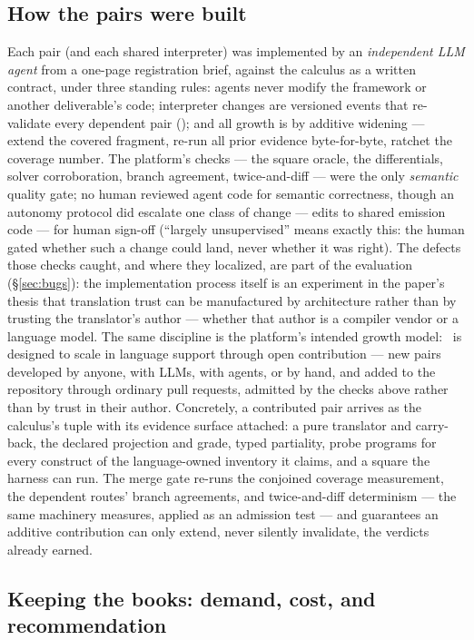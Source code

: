 \subsection{How the pairs were built}
\label{sec:agents}
Each pair (and each shared interpreter) was implemented by an
\emph{independent LLM agent} from a one-page registration brief, against
the calculus as a written contract, under three standing rules: agents
never modify the framework or another deliverable's code; interpreter
changes are versioned events that re-validate every dependent pair
(); and all growth is by additive widening --- extend
the covered fragment, re-run all prior evidence byte-for-byte, ratchet
the coverage number. The platform's checks --- the square oracle, the
differentials, solver corroboration, branch agreement, twice-and-diff ---
were the only \emph{semantic} quality gate; no human reviewed agent code
for semantic correctness, though an autonomy protocol did escalate one
class of change --- edits to shared emission code --- for human sign-off
(``largely unsupervised'' means exactly this: the human gated whether
such a change could land, never whether it was right).
The defects those checks caught, and where they localized,
are part of the evaluation (\S\ref{sec:bugs}): the implementation process
itself is an experiment in the paper's thesis that translation trust can
be manufactured by architecture rather than by trusting the translator's
author --- whether that author is a compiler vendor or a language model.
The same discipline is the platform's intended growth model: \hg\ is
designed to scale in language support through open contribution --- new
pairs developed by anyone, with LLMs, with agents, or by hand, and added
to the repository through ordinary pull requests, admitted by the checks
above rather than by trust in their author. Concretely, a contributed
pair arrives as the calculus's tuple with its evidence surface
attached: a pure translator and carry-back, the declared projection
and grade, typed \unsupported{} partiality, probe programs for every
construct of the language-owned inventory it claims, and a square the
harness can run. The merge gate re-runs the conjoined coverage
measurement, the dependent routes' branch agreements, and
twice-and-diff determinism --- the same machinery
 measures, applied as an admission test --- and
 guarantees an additive contribution can only
extend, never silently invalidate, the verdicts already earned.

\ifarxiv
\subsection{Keeping the books: demand, cost, and recommendation}
\label{sec:books}

